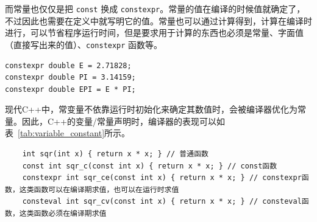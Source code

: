 而常量也仅仅是把 \verb|const| 换成 \verb|constexpr|。常量的值在编译的时候值就确定了，不过因此也需要在定义中就写明它的值。常量也可以通过计算得到，计算在编译时进行，可以节省程序运行时间，但是要求用于计算的东西也必须是常量、字面值（直接写出来的值）、\verb|constexpr| 函数等。

\begin{verbatim}
constexpr double E = 2.71828;
constexpr double PI = 3.14159;
constexpr double EPI = E * PI;
\end{verbatim}

现代C++中，常变量不依靠运行时初始化来确定其数值时，会被编译器优化为常量。因此，C++的变量/常量声明时，编译器的表现可以如表~\cref{tab:variable_constant}所示。

\begin{verbatim}
    int sqr(int x) { return x * x; } // 普通函数
    const int sqr_c(const int x) { return x * x; } // const函数
    constexpr int sqr_ce(const int x) { return x * x; } // constexpr函数，这类函数可以在编译期求值，也可以在运行时求值
    consteval int sqr_cv(const int x) { return x * x; } // consteval函数，这类函数必须在编译期求值
\end{verbatim}

